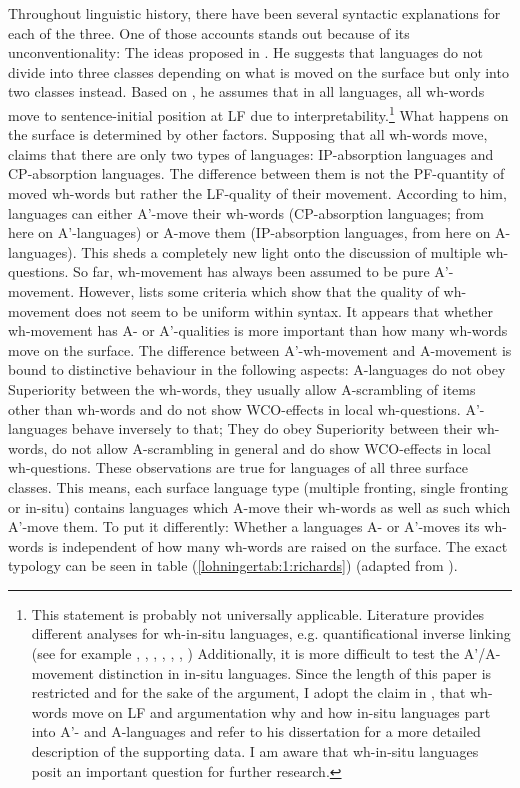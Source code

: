 \documentclass[output=paper,colorlinks,citecolor=brown]{langscibook}
\begin{document}
\noindent Throughout linguistic history, there have been  several syntactic explanations for each of the three. One of those accounts stands out because of its unconventionality: The ideas proposed in \cite{richards1997}. He suggests that languages do not divide into three classes depending on what is moved on the surface but only into two classes instead. Based on \cite{huang1982move}, he assumes that in all languages, all wh-words move to sentence-initial position at LF due to interpretability.\footnote{This statement is probably not universally applicable. Literature provides different analyses for wh-in-situ languages, e.g. quantificational inverse linking (see for example \citealp{may1978grammar}, \citealp{larson1985quantifying}, \citealp{may1985logical}, \citealp{chang1997wh}, \citealp{pollard1998unified}, \citealp{cooper2013quantification}, \citealp{may2017inverse}) Additionally, it is more difficult to test the A'/A-movement distinction in in-situ languages. Since the length of this paper is restricted and for the sake of the argument, I adopt the claim in \cite{huang1982move}, that wh-words move on LF and \cite{richards1997} argumentation why and how in-situ languages part into A'- and A-languages and refer to his dissertation for a more detailed description of the supporting data. I am aware that wh-in-situ languages posit an important question for further research.} What happens on the surface is determined by other factors. Supposing that all wh-words move, \cite{richards1997} claims that there are only two types of languages: IP-absorption languages and CP-absorption languages. The difference between them is not the PF-quantity of moved wh-words but rather the LF-quality of their movement. According to him, languages can either A'-move their wh-words (CP-absorption languages; from here on A'-languages) or A-move them (IP-absorption languages, from here on A-languages). This sheds a completely new light onto the discussion of multiple wh-questions. So far, wh-movement has always been assumed to be pure A'-movement. However, \cite{richards1997} lists some criteria which show that the quality of wh-movement does not seem to be uniform within syntax. It appears that whether wh-movement has A- or A'-qualities is more important than how many wh-words move on the surface. The difference between A'-wh-movement and A-movement is bound to distinctive behaviour in the following aspects: A-languages do not obey Superiority between the wh-words, they usually allow A-scrambling of items other than wh-words and do not show WCO-effects in local wh-questions. A'-languages behave inversely to that; They do obey Superiority between their wh-words, do not allow A-scrambling in general and do show WCO-effects in local wh-questions. These observations are true for languages of all three surface classes. This means, each surface language type (multiple fronting, single fronting or in-situ) contains languages which A-move their wh-words as well as such which A'-move them. To put it differently: Whether a languages A- or A'-moves its wh-words is independent of how many wh-words are raised on the surface. The exact typology can be seen in table (\ref{lohningertab:1:richards}) (adapted from \citealp{richards1997}). 
\end{document}
